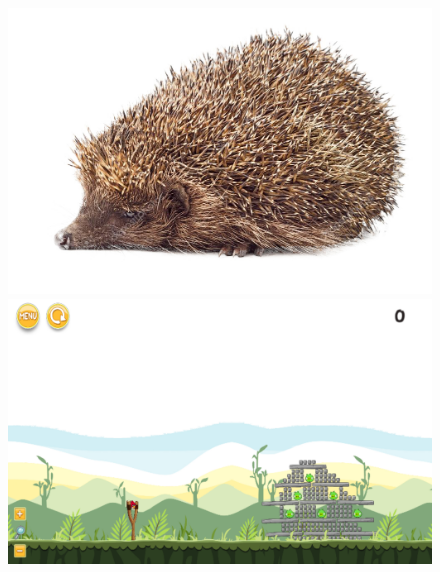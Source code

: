 \documentclass{dalthesis}
\begin{document}
\begin{figure}
  \includegraphics[width=\textwidth,height=\textheight,keepaspectratio]{levels/pictures/animals/hedgehog.jpg}
  \includegraphics[width=\textwidth,height=\textheight,keepaspectratio]{levels/screenshots/animals/hedgehog.png}
\end{figure}
\end{document}

